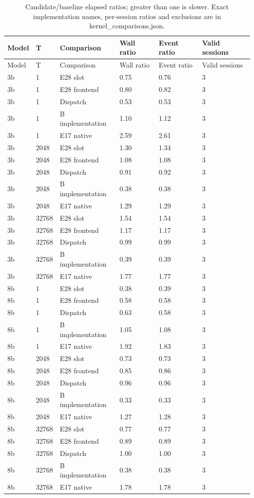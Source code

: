 {\small
\begin{longtable}{llllll}
\caption{Candidate/baseline elapsed ratios; greater than one is slower. Exact implementation names, per-session ratios and exclusions are in kernel\_comparisons.json.} \\
\toprule
Model & T & Comparison & Wall ratio & Event ratio & Valid sessions \\
\midrule
\endfirsthead
\toprule
Model & T & Comparison & Wall ratio & Event ratio & Valid sessions \\
\midrule
\endhead
3b & 1 & E28 slot & 0.75 & 0.76 & 3 \\
3b & 1 & E28 frontend & 0.80 & 0.82 & 3 \\
3b & 1 & Dispatch & 0.53 & 0.53 & 3 \\
3b & 1 & B implementation & 1.10 & 1.12 & 3 \\
3b & 1 & E17 native & 2.59 & 2.61 & 3 \\
3b & 2048 & E28 slot & 1.30 & 1.34 & 3 \\
3b & 2048 & E28 frontend & 1.08 & 1.08 & 3 \\
3b & 2048 & Dispatch & 0.91 & 0.92 & 3 \\
3b & 2048 & B implementation & 0.38 & 0.38 & 3 \\
3b & 2048 & E17 native & 1.29 & 1.29 & 3 \\
3b & 32768 & E28 slot & 1.54 & 1.54 & 3 \\
3b & 32768 & E28 frontend & 1.17 & 1.17 & 3 \\
3b & 32768 & Dispatch & 0.99 & 0.99 & 3 \\
3b & 32768 & B implementation & 0.39 & 0.39 & 3 \\
3b & 32768 & E17 native & 1.77 & 1.77 & 3 \\
8b & 1 & E28 slot & 0.38 & 0.39 & 3 \\
8b & 1 & E28 frontend & 0.58 & 0.58 & 3 \\
8b & 1 & Dispatch & 0.63 & 0.58 & 3 \\
8b & 1 & B implementation & 1.05 & 1.08 & 3 \\
8b & 1 & E17 native & 1.92 & 1.83 & 3 \\
8b & 2048 & E28 slot & 0.73 & 0.73 & 3 \\
8b & 2048 & E28 frontend & 0.85 & 0.86 & 3 \\
8b & 2048 & Dispatch & 0.96 & 0.96 & 3 \\
8b & 2048 & B implementation & 0.33 & 0.33 & 3 \\
8b & 2048 & E17 native & 1.27 & 1.28 & 3 \\
8b & 32768 & E28 slot & 0.77 & 0.77 & 3 \\
8b & 32768 & E28 frontend & 0.89 & 0.89 & 3 \\
8b & 32768 & Dispatch & 1.00 & 1.00 & 3 \\
8b & 32768 & B implementation & 0.38 & 0.38 & 3 \\
8b & 32768 & E17 native & 1.78 & 1.78 & 3 \\
\bottomrule
\end{longtable}
}
